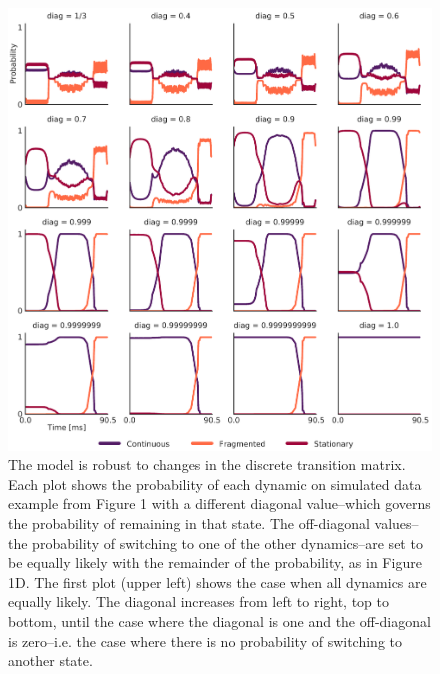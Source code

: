 \documentclass[times, twoside]{zHenriquesLab-StyleBioRxiv}
\begin{document}
\newpage

\beginsupplement
\captionsetup*{format=largeformat}

\begin{figure}%
\centering
\includegraphics[width=0.80\linewidth]{figures/Figure1-supplemental1/Figure1_v2_supplemental1}
\caption{The model is robust to changes in the discrete transition matrix. Each plot shows the probability of each dynamic on simulated data example from Figure 1 with a different diagonal value--which governs the probability of remaining in that state. The off-diagonal values--the probability of switching to one of the other dynamics--are set to be equally likely with the remainder of the probability, as in Figure 1D. The first plot (upper left) shows the case when all dynamics are equally likely. The diagonal increases from left to right, top to bottom, until the case where the diagonal is one and the off-diagonal is zero--i.e. the case where there is no probability of switching to another state.}
\label{fig:Figure1-Figure supplement 1}
\end{figure}
\end{document}
